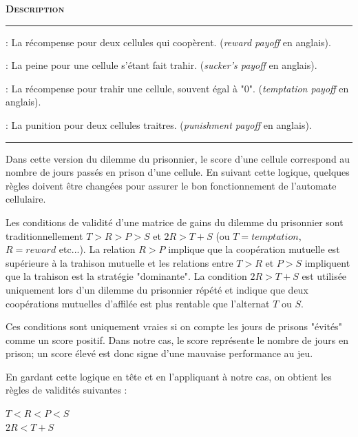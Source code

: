 \documentclass[a4paper, french]{article}
\begin{document}
\vspace{0.25cm}
\begin{description}[labelwidth=1.75cm]
    \small
    \item[\textbf{\textsc{Champ}}] \textbf{\textsc{Description}}
    \vspace{0.1cm}
    \hrule{}
    \item[\texttt{reward}] : La récompense pour deux cellules qui coopèrent. (\textit{reward payoff} en anglais).
    \item[\texttt{sucker}] : La peine pour une cellule s'étant fait trahir. (\textit{sucker's payoff} en anglais).
    \item[\texttt{temptation}] : La récompense pour trahir une cellule, souvent égal à "0". (\textit{temptation payoff} en anglais).
    \item[\texttt{punishment}] : La punition pour deux cellules traitres. (\textit{punishment payoff} en anglais).
\end{description}
\hrule{}
\vspace{0.5cm}

Dans cette version du dilemme du prisonnier, le score d'une cellule correspond au nombre de jours passés en prison d'une cellule. En suivant cette logique, quelques règles doivent être changées pour assurer le bon fonctionnement de l'automate cellulaire. 

Les conditions de validité d'une matrice de gains du dilemme du prisonnier sont traditionnellement $T > R > P > S$ et $2R > T + S$ (ou $T = temptation$, $R = reward$ etc...). La relation $R > P$ implique que la coopération mutuelle est supérieure à la trahison mutuelle et les relations entre $T > R$ et $P > S$ impliquent que la trahison est la stratégie "dominante". La condition $2R > T + S$ est utilisée uniquement lors d'un dilemme du prisonnier répété et indique que deux coopérations mutuelles d'affilée est plus rentable que l'alternat $T$ ou $S$. 

Ces conditions sont uniquement vraies si on compte les jours de prisons "évités" comme un score positif. Dans notre cas, le score représente le nombre de jours en prison; un score élevé est donc signe d'une mauvaise performance au jeu.

En gardant cette logique en tête et en l'appliquant à notre cas, on obtient les règles de validités suivantes :
\begin{framed}
    \centering
    $T < R < P < S$\\
    $2R < T + S$
\end{framed}
\end{document}
